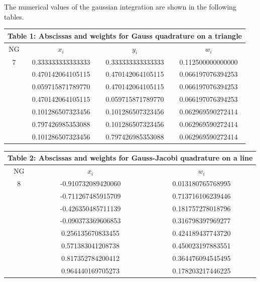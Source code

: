 \documentclass[12pt]{article}
\begin{document}
The numerical values of the gaussian integration are shown in the following tables.

\pagebreak
\begin{center}
\begin{tabular}{|c|c|c|c|}
\multicolumn{4}{c}{Table 1: Abscissas and weights for Gauss quadrature on a triangle}\\
\hline
NG & $x_i$ & $y_i$ & $w_i$\\
\hline\hline
7 & 0.333333333333333 & 0.333333333333333 & 0.112500000000000\\
 & 0.470142064105115 & 0.470142064105115 & 0.066197076394253\\
 & 0.059715871789770 & 0.470142064105115 & 0.066197076394253\\
 & 0.470142064105115 & 0.059715871789770 & 0.066197076394253\\
 & 0.101286507323456 & 0.101286507323456 & 0.062969590272414\\
 & 0.797426985353088 & 0.101286507323456 & 0.062969590272414\\
 & 0.101286507323456 & 0.797426985353088 & 0.062969590272414\\
\hline
\end{tabular}
\end{center}

\begin{center}
\begin{tabular}{|c|c|c|}
\multicolumn{3}{c}{Table 2: Abscissas and weights for Gauss-Jacobi quadrature on a line}\\
\hline
NG & $x_i$ & $w_i$\\
\hline\hline
8 & -0.910732089420060 & 0.013180765768995\\
 & -0.711267485915709 & 0.713716106239446\\
 & -0.426350485711139 & 0.181757278018796\\
 & -0.090373369606853 & 0.316798397969277\\
 & 0.256135670833455 & 0.424189437743720\\
 & 0.571383041208738 & 0.450023197883551\\
 & 0.817352784200412 & 0.364476094545495\\
 & 0.964440169705273 & 0.178203217446225\\
\hline
\end{tabular}
\end{center}
\end{document}
